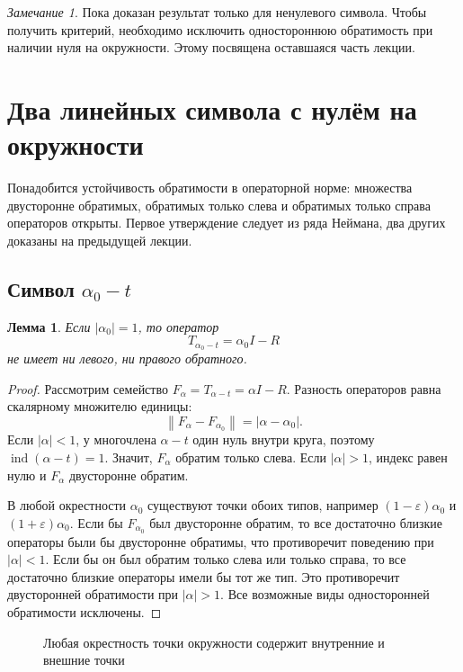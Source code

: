 \documentclass[12pt,a4paper]{article}
\newtheorem{lemma}{Лемма}
\theoremstyle{definition}
\theoremstyle{remark}
\newtheorem*{remark}{Замечание}
\newcommand{\norm}[1]{\left\lVert #1\right\rVert}
\DeclareMathOperator{\ind}{ind}
\begin{document}
\begin{remark}
Пока доказан результат только для ненулевого символа.
Чтобы получить критерий, необходимо исключить одностороннюю
обратимость при наличии нуля на окружности. Этому посвящена
оставшаяся часть лекции.
\end{remark}

\section{Два линейных символа с нулём на окружности}

Понадобится устойчивость обратимости в операторной норме:
множества двусторонне обратимых, обратимых только слева и обратимых
только справа операторов открыты. Первое утверждение следует
из ряда Неймана, два других доказаны на предыдущей лекции.

\subsection{Символ \texorpdfstring{$\alpha_0-t$}{alpha0 - t}}

\begin{lemma}
Если $|\alpha_0|=1$, то оператор
\[
  T_{\alpha_0-t}=\alpha_0 I-R
\]
не имеет ни левого, ни правого обратного.
\end{lemma}

\begin{proof}
Рассмотрим семейство $F_\alpha=T_{\alpha-t}=\alpha I-R$.
Разность операторов равна скалярному множителю единицы:
\[
  \norm{F_\alpha-F_{\alpha_0}}=|\alpha-\alpha_0|.
\]
Если $|\alpha|<1$, у многочлена $\alpha-t$ один нуль внутри круга,
поэтому $\ind(\alpha-t)=1$. Значит, $F_\alpha$ обратим только слева.
Если $|\alpha|>1$, индекс равен нулю и $F_\alpha$ двусторонне обратим.

В любой окрестности $\alpha_0$ существуют точки обоих типов,
например $(1-\varepsilon)\alpha_0$ и $(1+\varepsilon)\alpha_0$.
Если бы $F_{\alpha_0}$ был двусторонне обратим, то все достаточно
близкие операторы были бы двусторонне обратимы, что противоречит
поведению при $|\alpha|<1$.
Если бы он был обратим только слева или только справа, то все
достаточно близкие операторы имели бы тот же тип. Это противоречит
двусторонней обратимости при $|\alpha|>1$.
Все возможные виды односторонней обратимости исключены.
\end{proof}

\begin{figure}[ht]
  \centering
  \caption{Любая окрестность точки окружности содержит внутренние и внешние точки}
\end{figure}
\end{document}
